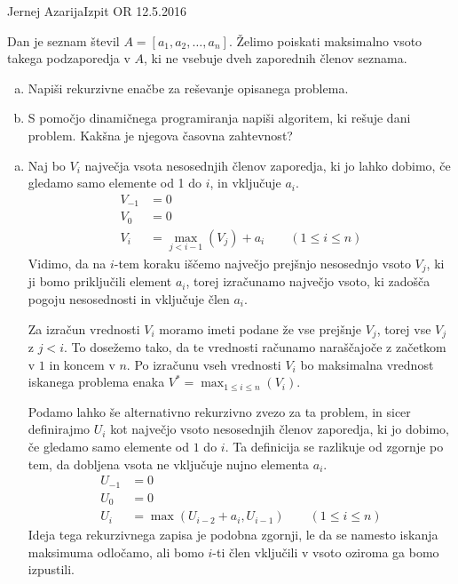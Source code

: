 \begin{naloga}{Jernej Azarija}{Izpit OR 12.5.2016}
\begin{vprasanje}
Dan je seznam števil $A = [a_1, a_2, \dots, a_n]$.
Želimo poiskati maksimalno vsoto takega podzaporedja v $A$,
ki ne vsebuje dveh zaporednih členov seznama.

\begin{enumerate}[(a)]
\item Napiši rekurzivne enačbe za reševanje opisanega problema.

\item S pomočjo dinamičnega programiranja napiši algoritem,
ki rešuje dani problem.
Kakšna je njegova časovna zahtevnost?
\end{enumerate}
\end{vprasanje}
\begin{odgovor}

\begin{enumerate}[(a)]

\item Naj bo $V_i$ največja vsota nesosednjih členov zaporedja, ki jo lahko dobimo,
če gledamo samo elemente od 1 do $i$, in vključuje $a_i$.
\begin{align*}
V_{-1} &= 0 \\
V_0 &= 0 \\
V_i &= \max_{j < i - 1}\left(V_j\right) + a_i
\qquad (1 \le i \le n)
\end{align*}
Vidimo, da na $i$-tem koraku iščemo največjo prejšnjo nesosednjo vsoto $V_j$,
ki ji bomo priključili element $a_i$, torej izračunamo največjo vsoto, 
ki zadošča pogoju nesosednosti in vključuje člen $a_i$.

Za izračun vrednosti $V_i$ moramo imeti podane že vse prejšnje $V_j$,
torej vse $V_j$ z $j < i$.
To dosežemo tako, da te vrednosti računamo naraščajoče z začetkom v $1$ in koncem v $n$.
Po izračunu vseh vrednosti $V_i$ bo maksimalna vrednost iskanega problema
enaka $V^* = \max_{1 \leq i \leq n}(V_i)$.

Podamo lahko še alternativno rekurzivno zvezo za ta problem, in sicer 
definirajmo $U_i$ kot največjo vsoto nesosednjih členov zaporedja,
ki jo dobimo, če gledamo samo elemente od $1$ do $i$.
Ta definicija se razlikuje od zgornje po tem, da dobljena vsota ne vključuje nujno elementa $a_i$.
\begin{align*}
U_{-1} &= 0 \\
U_0 &= 0 \\
U_i &= \max\left(U_{i - 2} + a_i, U_{i - 1}\right)
\qquad (1 \le i \le n)
\end{align*}
Ideja tega rekurzivnega zapisa je podobna zgornji,
le da se namesto iska\-nja maksimuma odločamo,
ali bomo $i$-ti člen vključili v vsoto oziroma ga bomo izpustili.


\end{enumerate}
\end{odgovor}
\end{naloga}
